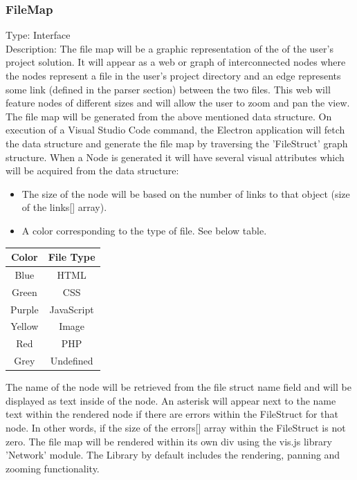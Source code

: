 \documentclass[letterpaper,10pt,titlepage,draftclsnofoot,onecolumn,onesided] {IEEEtran}
\begin{document}
	\subsubsection{FileMap}
	Type: Interface
	\\
	Description: 
	The file map will be a graphic representation of the of the user's project solution. 
	It will appear as a web or graph of interconnected nodes where the nodes represent a file in the user's project directory and an edge represents some link (defined in the parser section) between the two files. 
	This web will feature nodes of different sizes and will allow the user to zoom and pan the view.
	The file map will be generated from the above mentioned data structure. 
	On execution of a Visual Studio Code command, the Electron application will fetch the data structure and generate the file map by traversing the 'FileStruct' graph structure. 
	When a Node is generated it will have several visual attributes which will be acquired from the data structure:
	\\
	\begin{itemize}
	\item The size of the node will be based on the number of links to that object (size of the links[] array). 
	\item A color corresponding to the type of file. See below table.
	\end{itemize}
	\begin{tabular}{| c | c |}
	\hline
	Color & File Type\\
	\hline
	Blue & HTML \\
	Green & CSS \\
	Purple & JavaScript \\
	Yellow & Image \\
	Red & PHP \\
	Grey & Undefined \\
	\hline
	\end{tabular}
	
	The name of the node will be retrieved from the file struct name field and will be displayed as text inside of the node.
	An asterisk will appear next to the name text within the rendered node if there are errors within the FileStruct for that node. In other words, if the size of the errors[] array within the FileStruct is not zero.
	The file map will be rendered within its own div using the vis.js library 'Network' module. The Library by default includes the rendering, panning and zooming functionality.
	
\end{document}
